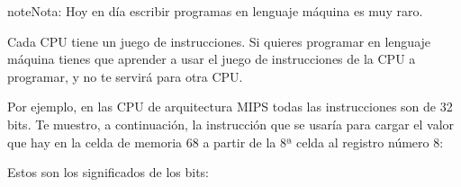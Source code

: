 \documentclass[letterpaper,10pt,spanish]{sphinxmanual}
\begin{document}
\begin{sphinxadmonition}{note}{Nota:}
\sphinxAtStartPar
Hoy en día escribir programas en lenguaje máquina es muy raro.
\end{sphinxadmonition}

\sphinxAtStartPar
Cada CPU tiene un juego de instrucciones. Si quieres programar en lenguaje máquina tienes que aprender a usar el juego de instrucciones de la CPU a programar, y no te servirá para otra CPU.

\sphinxAtStartPar
Por ejemplo, en las CPU de arquitectura MIPS todas las instrucciones son de 32 bits. Te muestro, a continuación, la instrucción que se usaría para cargar el valor que hay en la celda de memoria 68 a partir de la 8ª celda al registro número 8:

\begin{sphinxVerbatim}[commandchars=\\\{\}]
     
\end{sphinxVerbatim}

\sphinxAtStartPar
Estos son los significados de los bits:
\end{document}
